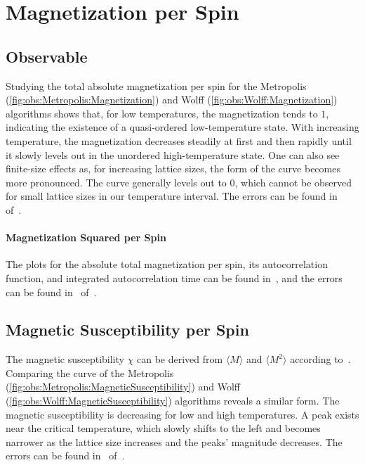 \section{Magnetization per Spin}\label{sec:res:magnet}
	\subsection{Observable}\label{sec:res:magnet:observable}
		Studying the total absolute magnetization per spin for the Metropolis (\cref{fig:obs:Metropolis:Magnetization}) and Wolff (\cref{fig:obs:Wolff:Magnetization}) algorithms shows that, for low temperatures, the magnetization tends to $1$, indicating the existence of a quasi-ordered low-temperature state. With increasing temperature, the magnetization decreases steadily at first and then rapidly until it slowly levels out in the unordered high-temperature state. One can also see finite-size effects as, for increasing lattice sizes, the form of the curve becomes more pronounced. The curve generally levels out to $0$, which cannot be observed for small lattice sizes in our temperature interval. The errors can be found in~ of~.
		
		\paragraph{Magnetization Squared per Spin}\label{sec:res:magnetsquare} The plots for the absolute total magnetization per spin, its autocorrelation function, and integrated autocorrelation time can be found in~, and the errors can be found in~ of~.
	
	\subsection{Magnetic Susceptibility per Spin}\label{sec:res:xs}
		The magnetic susceptibility $\chi$ can be derived from $\langle M \rangle$ and $\langle M^2 \rangle$ according to~.  Comparing the curve of the Metropolis (\cref{fig:obs:Metropolis:MagneticSusceptibility}) and Wolff (\cref{fig:obs:Wolff:MagneticSusceptibility}) algorithms reveals a similar form. The magnetic susceptibility is decreasing for low and high temperatures. A peak exists near the critical temperature, which slowly shifts to the left and becomes narrower as the lattice size increases and the peaks' magnitude decreases. The errors can be found in~ of~.
		
